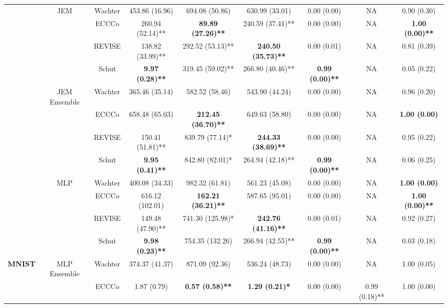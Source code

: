 \begin{table}
{\begin{tabular}[t]{>{}c|c|c|c|c|c|c|c|c}
 & \multirow{-4}{*}{\centering\arraybackslash JEM} & Wachter & 453.86 (16.96) & 694.08 (50.86) & 630.99 (33.01) & 0.00 (0.00) & NA & 0.90 (0.30)\\
\cline{2-9}
 &  & ECCCo & 260.94 (52.14)** & \textbf{89.89 (27.26)**} & 240.59 (37.41)** & 0.00 (0.00) & NA & \textbf{1.00 (0.00)**}\\

 &  & REVISE & 138.82 (33.99)** & 292.52 (53.13)** & \textbf{240.50 (35.73)**} & 0.00 (0.01) & NA & 0.81 (0.39)\\

 &  & Schut & \textbf{9.97 (0.28)**} & 319.45 (59.02)** & 266.80 (40.46)** & \textbf{0.99 (0.00)**} & NA & 0.05 (0.22)\\

 & \multirow{-4}{*}{\centering\arraybackslash JEM Ensemble} & Wachter & 365.46 (35.14) & 582.52 (58.46) & 543.90 (44.24) & 0.00 (0.00) & NA & 0.96 (0.20)\\
\cline{2-9}
 &  & ECCCo & 658.48 (65.03) & \textbf{212.45 (36.70)**} & 649.63 (58.80) & 0.00 (0.00) & NA & \textbf{1.00 (0.00)}\\

 &  & REVISE & 150.41 (51.81)** & 839.79 (77.14)* & \textbf{244.33 (38.69)**} & 0.00 (0.00) & NA & 0.95 (0.22)\\

 &  & Schut & \textbf{9.95 (0.41)**} & 842.80 (82.01)* & 264.94 (42.18)** & \textbf{0.99 (0.00)**} & NA & 0.06 (0.25)\\

 & \multirow{-4}{*}{\centering\arraybackslash MLP} & Wachter & 400.08 (34.33) & 982.32 (61.81) & 561.23 (45.08) & 0.00 (0.00) & NA & \textbf{1.00 (0.00)}\\
\cline{2-9}
 &  & ECCCo & 616.12 (102.01) & \textbf{162.21 (36.21)**} & 587.65 (95.01) & 0.00 (0.00) & NA & \textbf{1.00 (0.00)**}\\

 &  & REVISE & 149.48 (47.90)** & 741.30 (125.98)* & \textbf{242.76 (41.16)**} & 0.00 (0.01) & NA & 0.92 (0.27)\\

 &  & Schut & \textbf{9.98 (0.23)**} & 754.35 (132.26) & 266.94 (42.55)** & \textbf{0.99 (0.00)**} & NA & 0.03 (0.18)\\

\multirow{-16}{*}{\centering\arraybackslash \textbf{MNIST}} & \multirow{-4}{*}{\centering\arraybackslash MLP Ensemble} & Wachter & 374.37 (41.37) & 871.09 (92.36) & 536.24 (48.73) & 0.00 (0.00) & NA & 1.00 (0.05)\\
\cline{1-9}
 &  & ECCCo & 1.87 (0.79) & \textbf{0.57 (0.58)**} & \textbf{1.29 (0.21)*} & 0.00 (0.00) & 0.99 (0.18)** & 1.00 (0.00)\\


\end{tabular}}
\end{table}
